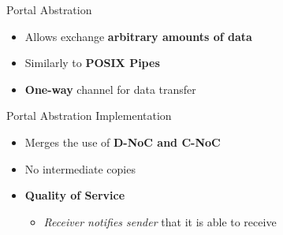 		\begin{frame}[fragile]{Portal Abstration}
			\begin{itemize}
				\item Allows exchange \textbf{arbitrary amounts of data} %
				\item Similarly to \textbf{POSIX Pipes}
				\item \textbf{One-way} channel for data transfer
			\end{itemize}


		\end{frame}

		\begin{frame}[fragile]{Portal Abstration Implementation}
			\begin{itemize}
				\item Merges the use of \textbf{D-NoC and C-NoC}
				\item No intermediate copies
				\item \textbf{Quality of Service}
				\begin{itemize}
					\item \textit{Receiver notifies sender} that it is able to receive
				\end{itemize}
			\end{itemize}


		\end{frame}


